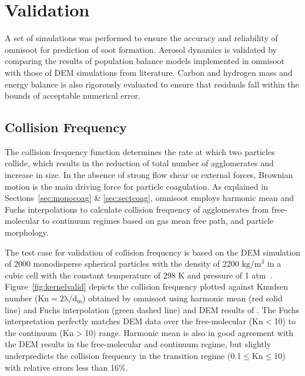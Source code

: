 \section{Validation}
A set of simulations was performed to ensure the accuracy and reliability of omnisoot for prediction of soot formation. Aerosol dynamics is validated by comparing the results of population balance models implemented in omnisoot with those of DEM simulations from literature. Carbon and hydrogen mass and energy balance is also rigorously evaluated to ensure that residuals fall within the bounds of acceptable numerical error.

\subsection{Collision Frequency}
The collision frequency function determines the rate at which two particles collide, which results in the reduction of total number of agglomerates and increase in size. In the absence of strong flow shear or external forces, Brownian motion is the main driving force for particle coagulation. As explained in Sections~\ref{sec:monocoag} \& \ref{sec:sectcoag}, omnisoot employs harmonic mean and Fuchs interpolations to calculate collision frequency of agglomerates from free-molecular to continuum regimes based on gas mean free path, and particle morphology. 

The test case for validation of collision frequency is based on the DEM simulation of 2000 monodisperse spherical particles with the density of 2200 $\mathrm{kg/m^3}$ in
a cubic cell with the constant temperature of 298 K and pressure of 1 atm~\citep{goudeli2015coagulation}. Figure~\ref{fig:kernelvalid} depicts the collision frequency plotted against Knudsen number ($\mathrm{Kn=2\lambda/d_m}$) obtained by omnisoot using harmonic mean (red solid line) and Fuchs interpolation (green dashed line) and DEM results of \citet{goudeli2015coagulation}. The Fuchs interpretation perfectly matches DEM data over the free-molecular (Kn$<$10) to the continuum (Kn$>$10) range. Harmonic mean is also in good agreement with the DEM results in the free-molecular and continuum regime, but slightly underpredicts the collision frequency in the transition regime (0.1$\le$Kn$\le$10) with relative errors less than 16\%.

